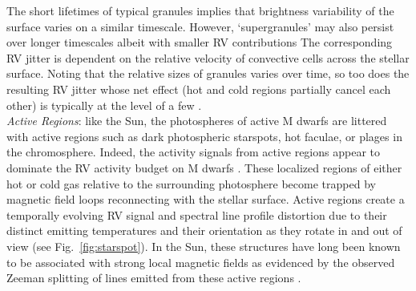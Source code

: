 The short lifetimes of typical granules
\citep[$\sim 10$ minutes;][]{hall08,gilliland11} implies that brightness variability of the
surface varies on a similar timescale. However, `supergranules' may also persist over longer
timescales albeit with smaller RV contributions \citep[$\lesssim 1$ \mps{;}][]{rincon17}
The corresponding RV jitter is dependent on the relative velocity of convective
cells across the stellar surface. Noting that the relative sizes of granules varies over time, so
too does the resulting RV jitter whose net effect (hot and cold regions partially
cancel each other) is typically at the level of a few \mps{} \citep{lindegren03}. \\

\emph{Active Regions}:
like the Sun, the photospheres of active M dwarfs are littered with active regions such
as dark photospheric starspots, hot faculae, or plages in the chromosphere. Indeed,
the activity signals from active regions appear to dominate the RV activity budget on M dwarfs
\citep{lindegren03}. These localized regions of either
hot or cold gas relative to the surrounding photosphere become trapped by magnetic field loops reconnecting
with the stellar surface. Active regions create a temporally evolving
RV signal and spectral line profile distortion due to their distinct emitting temperatures and their orientation
as they rotate in and out of view (see Fig.~\ref{fig:starspot}). In the Sun, these structures
have long been known to be associated with strong local magnetic fields as evidenced by the observed
Zeeman splitting of lines emitted from these active regions \citep{hale08}. \\


